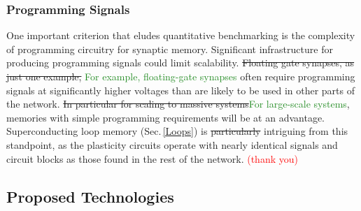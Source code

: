 \documentclass[twocolumn]{article}
\begin{document}
\subsubsection{Programming Signals}
One important criterion that eludes quantitative benchmarking is the complexity of programming circuitry for synaptic memory. Significant infrastructure for producing programming signals could limit scalability. \sout{Floating gate synapses, as just one example,} \textcolor{ForestGreen}{For example, floating-gate synapses} often require programming signals at significantly higher voltages than are likely to be used in other parts of the network. \sout{In particular for scaling to massive systems}\textcolor{ForestGreen}{For large-scale systems}, memories with simple programming requirements will be at an advantage. Superconducting loop memory (Sec.\,\ref{Loops}) is \sout{particularly} intriguing from this standpoint, as the plasticity circuits operate with nearly identical signals and circuit blocks as those found in the rest of the network. \textcolor{red}{(thank you)}

\subsection{Proposed Technologies}\label{Proposed}
\end{document}
